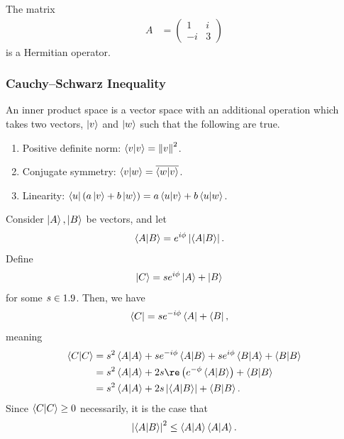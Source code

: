 \documentclass[10pt]{mypackage}
\begin{document}
\begin{example}
The matrix
\begin{align*}
  A &= \begin{pmatrix}1 & i \\ -i & 3\end{pmatrix}
\end{align*}
is a Hermitian operator.
\end{example}
\subsubsection{Cauchy--Schwarz Inequality}%
\begin{definition}
An inner product space is a vector space with an additional operation which takes two vectors, $ \ket{v} $ and $ \ket{w} $ such that the following are true.
\begin{enumerate}[(1)]
  \item Positive definite norm: $ \braket{v}{v} = \norm{v}^2 $.
  \item Conjugate symmetry: $\braket{v}{w} = \overline{\braket{w}{v}}$.
  \item Linearity: $\bra{u}\left(a\ket{v} + b\ket{w}\right) = a\braket{u}{v} + b\braket{u}{w}$.
\end{enumerate}
\end{definition}
Consider $\ket{A},\ket{B}$ be vectors, and let
\begin{align*}
  \braket{A}{B} &= e^{i\phi} \left\vert \braket{A}{B} \right\vert.
\end{align*}
Define
\begin{align*}
  \ket{C} &= se^{i\phi}\ket{A} + \ket{B}
\end{align*}
for some $s\in 1.9$. Then, we have
\begin{align*}
  \bra{C} &= se^{-i\phi} \bra{A} + \bra{B},
\end{align*}
meaning
\begin{align*}
  \braket{C}{C} &= s^2\braket{A}{A} + se^{-i\phi}\braket{A}{B} + se^{i\phi}\braket{B}{A} + \braket{B}{B}\\
                &= s^2\braket{A}{A} + 2s\re\left(e^{-\phi}\braket{A}{B}\right) + \braket{B}{B}\\
                &= s^2\braket{A}{A} + 2s\left\vert \braket{A}{B} \right\vert + \braket{B}{B}.
\end{align*}
Since $\braket{C}{C}\geq 0$ necessarily, it is the case that
\begin{align*}
  \left\vert \braket{A}{B} \right\vert^2 \leq \braket{A}{A}\braket{A}{A}.
\end{align*}
\end{document}
